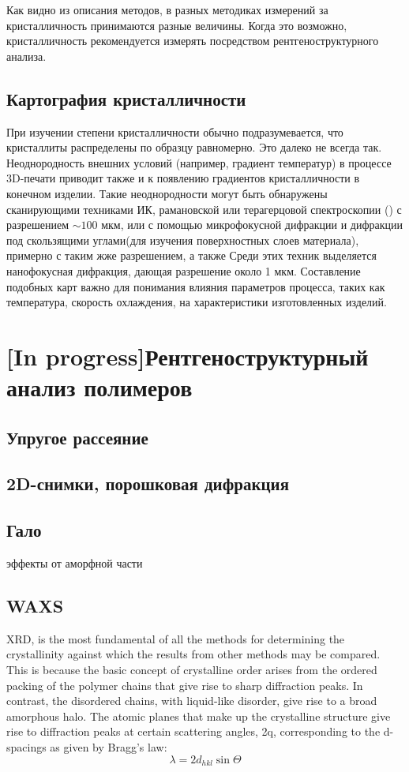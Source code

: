 Как видно из описания методов, в разных методиках измерений за кристалличность принимаются разные величины. Когда это возможно, кристалличность рекомендуется измерять посредством рентгеноструктурного анализа. 


\subsection{Картография кристалличности}
При изучении степени кристалличности обычно подразумевается, что кристаллиты распределены по образцу равномерно. Это далеко не всегда так. Неоднородность внешних условий (например, градиент температур) в процессе 3D-печати приводит также и к появлению градиентов кристалличности в конечном изделии. 
Такие неоднородности могут быть обнаружены сканирующими техниками ИК, рамановской или терагерцовой спектроскопии (\cite{thz})  с разрешением $\sim 100$ мкм, или с помощью микрофокусной дифракции и дифракции под скользящими углами(для изучения поверхностных слоев материала), примерно с таким жже разрешением, а также  Среди этих техник выделяется нанофокусная дифракция, дающая разрешение около 1 мкм.
Составление подобных карт важно для понимания влияния параметров процесса, таких как температура, скорость охлаждения, на характеристики изготовленных изделий.



\section{[In progress]Рентгеноструктурный анализ полимеров}

\subsection{Упругое рассеяние}
\subsection{2D-снимки, порошковая дифракция}
\subsection{Гало}
эффекты от аморфной части
\subsection{WAXS}
XRD, is the most fundamental of all
the methods for determining the crystallinity against which the results from
other methods may be compared.\\
This is because the basic concept of crystalline
order arises from the ordered packing of the polymer chains that give rise to sharp
diffraction peaks. In contrast, the disordered chains, with liquid-like disorder, give
rise to a broad amorphous halo. The atomic planes that make up the crystalline
structure give rise to diffraction peaks at certain scattering angles, 2q, corresponding
to the d-spacings as given by Bragg’s law:
\[
\lambda = 2d_{hkl} \sin \Theta
\]

